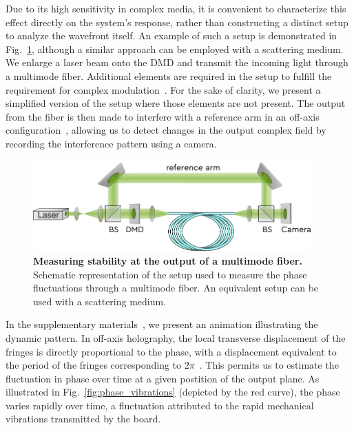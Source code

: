 \documentclass[12pt]{iopart}
\begin{document}
Due to its high sensitivity in complex media,
it is convenient to characterize this effect
directly on the system's response,
rather than constructing a distinct setup to analyze the wavefront itself.
An example of such a setup is demonstrated in Fig.~\ref{fig:MMF_ref},
although a similar approach can be employed with a scattering medium.
We enlarge a laser beam onto the DMD and transmit the incoming light through a multimode fiber.
Additional elements are required in the setup to fulfill the requirement for complex modulation~\cite{Gutierrez2024DMD}.
For the sake of clarity, we present a simplified version of the setup where those elements are not present.
The output from the fiber is then made to interfere with a reference arm
in an off-axis configuration~\cite{Cuche2000spatial},
allowing us to detect changes in the output complex field
by recording the interference pattern using a camera.\\




\begin{figure}[ht]
  \centering
  \includegraphics[width = 0.95\textwidth]{images/MMF_ref.pdf}
  \caption{
    \textbf{Measuring stability at the output of a multimode fiber.}
    Schematic representation of the setup used to measure the phase fluctuations
    through a multimode fiber.
    An equivalent setup can be used with a scattering medium.
  }
  \label{fig:MMF_ref}
\end{figure}

In the supplementary materials~\cite{}, we present an animation illustrating the dynamic pattern.
In off-axis holography,
the local transverse displacement of the fringes
is directly proportional to the phase,
with a displacement equivalent to the period of the fringes corresponding to $2\pi$~\cite{Cuche2000spatial}.
This permits us to estimate the fluctuation in phase over time at a given postition of the output plane.
As illustrated in Fig.~\ref{fig:phase_vibrations} (depicted by the red curve),
the phase varies rapidly over time,
a fluctuation attributed to the rapid mechanical vibrations transmitted by the board.\\
\end{document}
